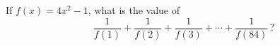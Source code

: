 If $f(x)=4x^2-1$, what is the value of
\[
\dfrac{1}{f(1)}+\dfrac{1}{f(2)}+\dfrac{1}{f(3)}+\cdots+\dfrac{1}{f(84)}\,?
\]
